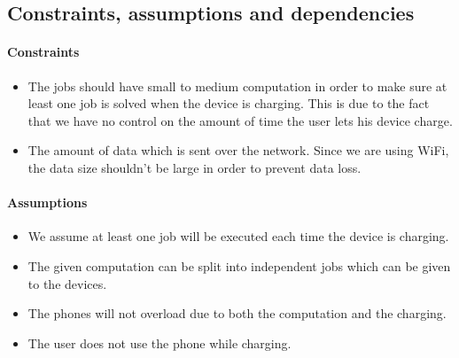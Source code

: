 \documentclass[a4paper,10pt]{article}
\begin{document}


\subsection{Constraints, assumptions and dependencies}
\paragraph{Constraints}
\begin{itemize}
	\item The jobs should have small to medium computation in order to make sure at least one job is solved when the device is charging. This is due to the fact that we have no control on the amount of time the user lets his device charge.

	\item The amount of data which is sent over the network. Since we are using WiFi, the data size shouldn't be large in order to prevent data loss.
\end{itemize} 

\paragraph{Assumptions}
\begin{itemize}
	\item We assume at least one job will be executed each time the device is charging. 
	\item The given computation can be split into independent jobs which can be given to the devices.
	\item The phones will not overload due to both the computation and the charging.
	\item The user does not use the phone while charging.
\end{itemize} 
\end{document}
